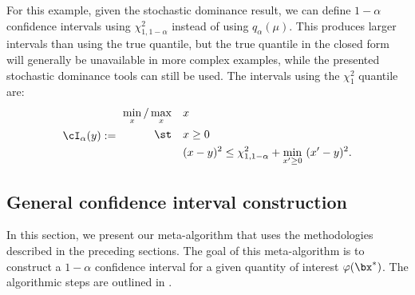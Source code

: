 \documentclass[11pt]{article}
\numberwithin{equation}{section}
\numberwithin{figure}{section}
\begin{document}
For this example, given the stochastic dominance result, we can define $1-\alpha$ confidence intervals using $\chi^2_{1, 1-\alpha}$ instead of using $q_\alpha(\mu)$. 
This produces larger intervals than using the true quantile, but the true quantile in the closed form will generally be unavailable in more complex examples, while the presented stochastic dominance tools can still be used. 
The intervals using the $\chi^2_1$ quantile are:
\begin{equation}\label{opt4new1d_quantile_sec3}
\cI_\alpha(y) 
:=~
\begin{aligned}
\min_{x}/\max_{x} \quad & x \\
\st \quad & x \geq 0\\
& (x-y)^2 \leq \chi^2_{1, 1-\alpha} + \min_{x' \geq 0} ~ (x'-y)^2.
\end{aligned}
\end{equation}

\subsection{General confidence interval construction}
\label{subsec:algorithm}

In this section, we present our meta-algorithm that uses the methodologies described in the preceding sections. 
The goal of this meta-algorithm is to construct a $1-\alpha$ confidence interval for a given quantity of interest $\varphi(\bx^*)$. 
The algorithmic steps are outlined in .
\end{document}

